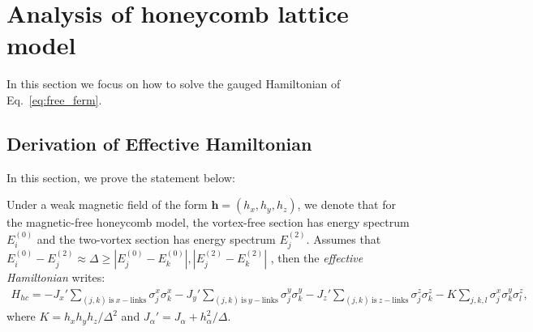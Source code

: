 \section{Analysis of honeycomb lattice model\label{app:ana}}

In this section we focus on how to solve the gauged Hamiltonian of Eq.~\eqref{eq:free_ferm}. 
\subsection{Derivation of Effective Hamiltonian}
In this section, we prove the statement below:
\begin{theorem}\label{theo:perturbed_honeycomb}
    Under a weak magnetic field of the form $\mathbf{h} = (h_x,h_y,h_z) $, we denote that for the magnetic-free honeycomb model, the vortex-free section has energy spectrum $E_i^{(0)}$ and the two-vortex section has energy spectrum $E_j^{(2)}$. Assumes that  $E_i^{(0)} - E_j^{(2)} \approx \Delta \geq |E^{(0)}_j - E^{(0)}_k|,|E^{(2)}_j - E^{(2)}_k|$ , then the \textit{effective Hamiltonian} writes:  
    \begin{align}H_{hc}=-J_x'\sum_{(j,k)\mathrm{~is~}x-\mathrm{links}}\sigma_j^x\sigma_k^x-J_y'\sum_{(j,k)\mathrm{~is~}y-\mathrm{links}}\sigma_j^y\sigma_k^y-J_z'\sum_{(j,k)\mathrm{~is~}z-\mathrm{links}}\sigma_j^z\sigma_k^z - K\sum_{j,k,l}\sigma_j^x \sigma_k^y \sigma_l^z,\end{align}
    where $K = {h_xh_yh_z}/{\Delta^2}$ and $J_{\alpha}' = J_{\alpha} + h_{\alpha}^2/\Delta$.
\end{theorem}
